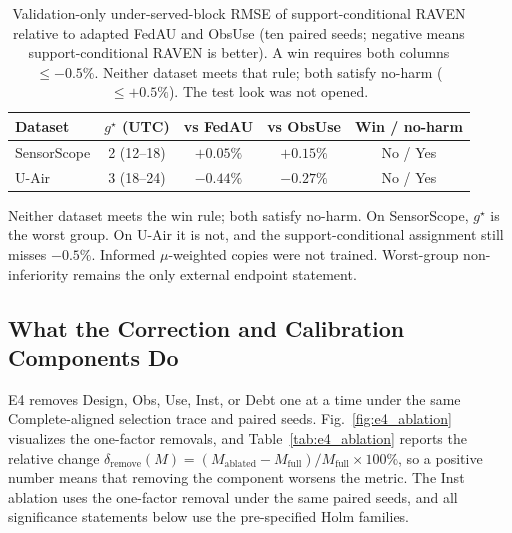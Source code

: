 \documentclass[letterpaper,journal]{IEEEtran}
\begin{document}
\begin{table}[t]
\centering
\caption{Validation-only under-served-block RMSE of support-conditional RAVEN relative
to adapted FedAU and ObsUse (ten paired seeds; negative means
support-conditional RAVEN is better).  A win requires both columns $\le-0.5\%$.  Neither
dataset meets that rule; both satisfy no-harm ($\le+0.5\%$).  The test
look was not opened.}
\label{tab:underserved_block}
\setlength{\tabcolsep}{3.5pt}
\begin{tabular}{lcccc}
\toprule
Dataset & $g^{\star}$ (UTC) & vs FedAU & vs ObsUse & Win / no-harm\\
\midrule
SensorScope & 2 (12--18) & $+0.05\%$ & $+0.15\%$ & No / Yes\\
U-Air & 3 (18--24) & $-0.44\%$ & $-0.27\%$ & No / Yes\\
\bottomrule
\end{tabular}
\end{table}

Neither dataset meets the win rule; both satisfy no-harm.
On SensorScope, $g^{\star}$ is the worst group.  On U-Air it is not, and
the support-conditional assignment still misses $-0.5\%$.  Informed $\mu$-weighted copies
were not trained.  Worst-group non-inferiority remains the only external
endpoint statement.

\subsection{What the Correction and Calibration Components Do}
\label{subsec:eval_rq3}

E4 removes Design, Obs, Use, Inst, or Debt one at a time under the same
Complete-aligned selection trace and paired seeds.  Fig.~\ref{fig:e4_ablation}
visualizes the one-factor removals, and Table~\ref{tab:e4_ablation}
reports the relative change
$\delta_{\mathrm{remove}}(M)
=(M_{\mathrm{ablated}}-M_{\mathrm{full}})/M_{\mathrm{full}}\times100\%$,
so a positive number means that removing the component worsens the metric.
The Inst ablation uses the one-factor removal under the same paired seeds, and
all significance statements below use the pre-specified Holm families.
\end{document}

